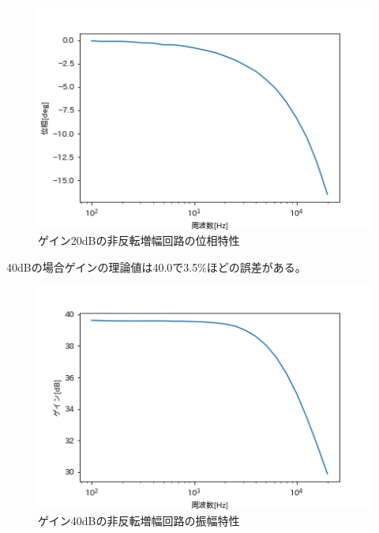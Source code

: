 \documentclass[dvipdfmx, twocolumn]{jsarticle}
\begin{document}
\begin{enumerate}
\begin{itemize}
\begin{figure}[H]
\begin{center}
\includegraphics[scale = 0.5]{nP20dB.png}
\caption{ゲイン20dBの非反転増幅回路の位相特性}
\end{center}
\end{figure}


40dBの場合ゲインの理論値は40.0で3.5\%ほどの誤差がある。

\begin{figure}[H]
\begin{center}
\includegraphics[scale = 0.5]{nG40dB.png}
\caption{ゲイン40dBの非反転増幅回路の振幅特性}
\end{center}
\end{figure}


\end{itemize}
\end{enumerate}
\end{document}
